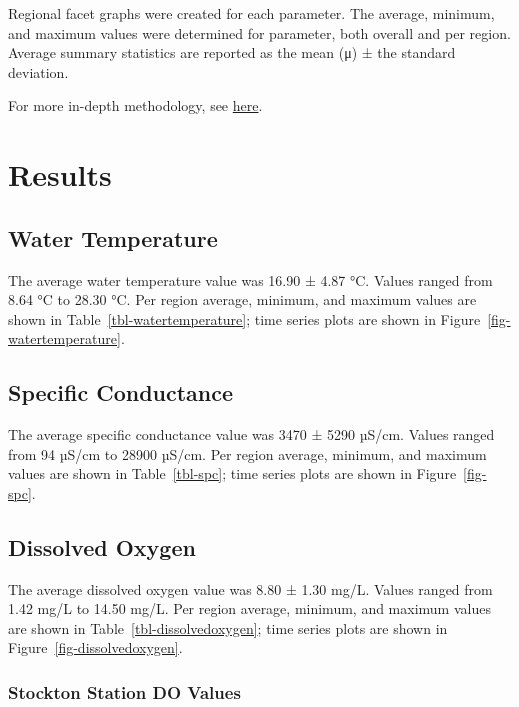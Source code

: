 \documentclass[
  letterpaper,
]{article}
\begin{document}
Regional facet graphs were created for each parameter. The average,
minimum, and maximum values were determined for parameter, both overall
and per region. Average summary statistics are reported as the mean (μ)
± the standard deviation.

For more in-depth methodology, see
\href{https://portal.edirepository.org/nis/metadataviewer?packageid=edi.1320.6}{here}.

\section{Results}\label{results}

\subsection{Water Temperature}\label{water-temperature}

The average water temperature value was 16.90 ± 4.87 °C. Values ranged
from 8.64 °C to 28.30 °C. Per region average, minimum, and maximum
values are shown in Table~\ref{tbl-watertemperature}; time series plots
are shown in Figure~\ref{fig-watertemperature}.

\subsection{Specific Conductance}\label{specific-conductance}

The average specific conductance value was 3470 ± 5290 µS/cm. Values
ranged from 94 µS/cm to 28900 µS/cm. Per region average, minimum, and
maximum values are shown in Table~\ref{tbl-spc}; time series plots are
shown in Figure~\ref{fig-spc}.

\subsection{Dissolved Oxygen}\label{dissolved-oxygen}

The average dissolved oxygen value was 8.80 ± 1.30 mg/L. Values ranged
from 1.42 mg/L to 14.50 mg/L. Per region average, minimum, and maximum
values are shown in Table~\ref{tbl-dissolvedoxygen}; time series plots
are shown in Figure~\ref{fig-dissolvedoxygen}.

\subsubsection{Stockton Station DO
Values}\label{stockton-station-do-values}
\end{document}
